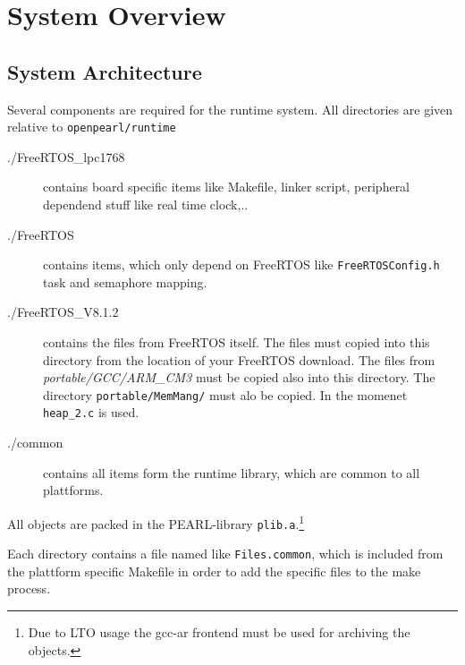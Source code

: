 \section{System Overview}

\subsection{System Architecture}
Several components are required for the runtime system.
All directories are given relative to \verb|openpearl/runtime|

\begin{description}
\item[./FreeRTOS\_lpc1768] contains board specific items like
Makefile, linker script, peripheral dependend stuff like real time clock,..
\item[./FreeRTOS] contains items, which only depend on FreeRTOS like
 \verb|FreeRTOSConfig.h| task and semaphore mapping.
\item[./FreeRTOS\_V8.1.2] contains the files from FreeRTOS itself.
 The files must copied into this directory from the
  location of your FreeRTOS download. The files from 
  {\em portable/GCC/ARM\_CM3}  must be copied also into this directory.
  The directory \verb|portable/MemMang/| must alo be copied. 
  In the momenet \verb|heap_2.c| is used. 
\item[./common] contains all items form the runtime library, which are common
  to all plattforms.
\end{description}
All objects are packed in the PEARL-library \verb|plib.a|.\footnote{Due
 to LTO usage
the gcc-ar frontend must be used for archiving the objects.
}

Each directory contains a file named like \verb|Files.common|, which is
included from the plattform specific Makefile in order to add the 
specific files to the make process.

